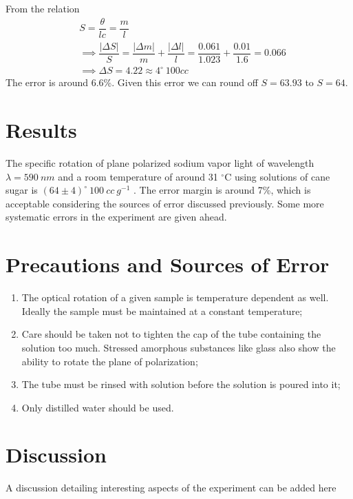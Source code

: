\documentclass{dkpinto-report}
\begin{document}
From the relation
\begin{align*}
& S = \dfrac{\theta}{lc} = \dfrac{m}{l} \\
&\implies \dfrac{|\Delta S|}{S}  = \dfrac{|\Delta m|}{m} + \dfrac{|\Delta l| }{l} = \dfrac{0.061}{1.023} + \dfrac{0.01}{1.6} = 0.066\\
&\implies \Delta S =  4.22 \approx 4^{\circ}\ 100 cc
\end{align*}
The error is around 6.6\%. Given this error we can round off $S = 63.93$ to $S = 64$.

\section{Results}
The specific rotation of plane polarized sodium vapor light of wavelength $\lambda = 590\ nm$ and a room temperature of  around 31 $^{\circ}$C using solutions of cane sugar is $(64  \pm 4 ) ^{\circ}\ 100\ cc\ g^{-1}$ . The error margin is around 7\%, which is acceptable considering the sources of error discussed previously. Some more systematic errors in the experiment are given ahead.

 
\section{Precautions and Sources of Error}
\begin{enumerate}
\item The optical rotation of a given sample is temperature dependent as well. Ideally the sample must be maintained at a constant temperature;
\item Care should be taken not to tighten the cap of the tube containing the solution too much.  Stressed amorphous substances like glass also show the ability to rotate the plane of polarization;
\item The tube must be rinsed with solution before the solution is poured into it;
\item Only distilled water should be used.
\end{enumerate}

\section{Discussion}
A discussion detailing interesting aspects of the experiment can be added here


\end{document}
